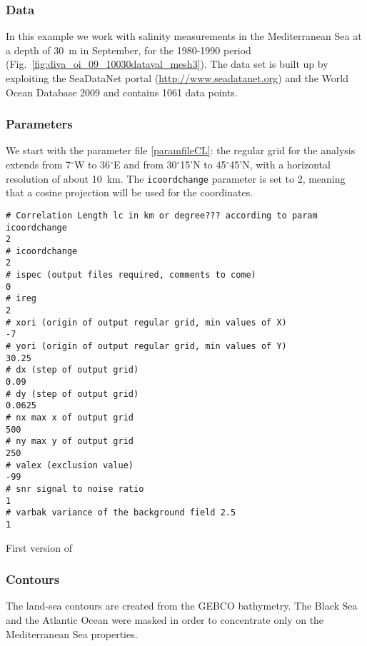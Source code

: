 \subsubsection{Data}

In this example we work with salinity measurements in the Mediterranean Sea at a depth of 30~m in September, for the 1980-1990 period (Fig.~\ref{fig:diva_oi_09_10030dataval_mesh3}). The data set is built up by exploiting the SeaDataNet portal (\url{http://www.seadatanet.org}) and the World Ocean Database 2009 \citep[WOD09,][]{BOYER09} and contains 1061 data points. 

\subsubsection{Parameters}

We start with the parameter file \ref{paramfileCL}: the regular grid for the analysis extends from 7$^{\circ}$W to 36$^{\circ}$E and from 30$^{\circ}$15'N to 45$^{\circ}$45'N, with a horizontal resolution of about 10~km. The \texttt{icoordchange} parameter is set to 2, meaning that a cosine projection will be used for the coordinates.

\begin{exfile}[htpb]
\begin{footnotesize}
\begin{verbatim}
# Correlation Length lc in km or degree??? according to param icoordchange
2
# icoordchange
2
# ispec (output files required, comments to come)
0
# ireg
2
# xori (origin of output regular grid, min values of X)
-7
# yori (origin of output regular grid, min values of Y)
30.25
# dx (step of output grid)
0.09
# dy (step of output grid)
0.0625
# nx max x of output grid
500
# ny max y of output grid
250
# valex (exclusion value)
-99
# snr signal to noise ratio
1
# varbak variance of the background field 2.5
1
\end{verbatim}
\end{footnotesize}
\caption{First version of \label{paramfileCL}}
\end{exfile}

\subsubsection{Contours}

The land-sea contours are created from the GEBCO bathymetry. The Black Sea and the Atlantic Ocean were masked in order to concentrate only on the Mediterranean Sea properties. 

